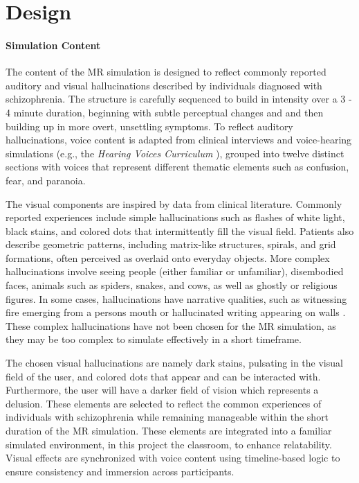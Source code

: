 \section{Design}

\paragraph{Simulation Content} The content of the MR simulation is designed to reflect commonly reported auditory and visual hallucinations described by individuals diagnosed with schizophrenia. The structure is carefully sequenced to build in intensity over a 3 - 4 minute duration, beginning with subtle perceptual changes and and then building up in more overt, unsettling symptoms. To reflect auditory hallucinations, voice content is adapted from clinical interviews and voice-hearing simulations (e.g., the \textit{Hearing Voices Curriculum} \cite{Chaffin2013}), grouped into twelve distinct sections with voices that represent different thematic elements such as confusion, fear, and paranoia.

\vspace{1em}

The visual components are inspired by data from clinical literature. Commonly reported experiences include simple hallucinations such as flashes of white light, black stains, and colored dots that intermittently fill the visual field. Patients also describe geometric patterns, including matrix-like structures, spirals, and grid formations, often perceived as overlaid onto everyday objects. More complex hallucinations involve seeing people (either familiar or unfamiliar), disembodied faces, animals such as spiders, snakes, and cows, as well as ghostly or religious figures. In some cases, hallucinations have narrative qualities, such as witnessing fire emerging from a persons mouth or hallucinated writing appearing on walls \cite{Vanommen2019,Silverstein2021}. These complex hallucinations have not been chosen for the MR simulation, as they may be too complex to simulate effectively in a short timeframe.

\vspace{1em}

The chosen visual hallucinations are namely dark stains, pulsating in the visual field of the user, and colored dots that appear and can be interacted with. Furthermore, the user will have a darker field of vision which represents a delusion. These elements are selected to reflect the common experiences of individuals with schizophrenia while remaining manageable within the short duration of the MR simulation.  These elements are integrated into a familiar simulated environment, in this project the classroom, to enhance relatability. Visual effects are synchronized with voice content using timeline-based logic to ensure consistency and immersion across participants.

